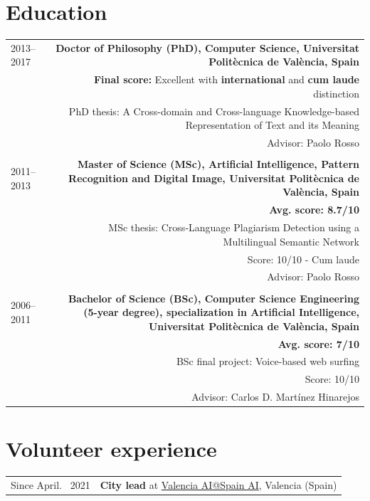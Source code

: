 \documentclass[10pt]{article}
\begin{document}
\section*{Education}
\begin{tabular}{L!{\VRule}R}
	2013--2017 &{\bf Doctor of Philosophy (PhD), Computer Science, Universitat Polit{\`e}cnica de Val{\`e}ncia, Spain}\vspace{5pt}\\
	&\textbf{Final score:} Excellent  with \textbf{international} and \textbf{cum laude} distinction\\
	&\scriptsize{PhD thesis: A Cross-domain and Cross-language Knowledge-based Representation of Text and its Meaning}\\
	&\scriptsize{Advisor: Paolo Rosso}\\
	&\\
	2011--2013&{\bf Master of Science (MSc), Artificial Intelligence, Pattern Recognition and Digital Image, Universitat Polit{\`e}cnica de Val{\`e}ncia, Spain}\vspace{5pt}\\
	&\bf Avg. score: 8.7/10\\
	&\scriptsize{MSc thesis: Cross-Language Plagiarism Detection using a Multilingual Semantic Network}\\
	&\scriptsize{Score: 10/10  -  Cum laude}\\
	&\scriptsize{Advisor: Paolo Rosso}\\
	&\\
	2006--2011& \bf Bachelor of Science (BSc), Computer Science Engineering (5-year degree), specialization in Artificial Intelligence, Universitat Polit{\`e}cnica de Val{\`e}ncia, Spain\vspace{5pt}\\
	&\bf Avg. score: 7/10\\
	&\scriptsize{BSc final project: Voice-based web surfing}\\
	&\scriptsize{Score: 10/10}\\
	&\scriptsize{Advisor: Carlos D. Mart\'inez Hinarejos}\\ 
\end{tabular}

\section*{Volunteer experience}
\begin{tabular}{L!{\VRule}R}
Since April.~ 2021 &{\textbf{City lead} at \href{https://www.spain-ai.com/}{Valencia AI@Spain AI}, Valencia (Spain)}\\
\end{tabular}
\end{document}
